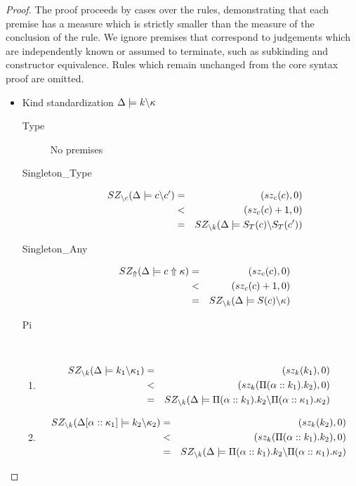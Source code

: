 \documentclass[12pt,twoside,fleqn]{amsart}
\theoremstyle{plain}
\theoremstyle{plain}
\theoremstyle{definition}
\begin{document}
\begin{proof}
The proof proceeds by cases over the rules, demonstrating that each premise
has a measure which is strictly smaller than the measure of the conclusion of
the rule. We ignore premises that correspond to judgements which are independently
known or assumed to terminate, such as subkinding and constructor equivalence.
Rules which remain unchanged from the core syntax proof are omitted.
\begin{itemize}
\item Kind standardization \( \Delta  \models k \backslash \kappa  \)

\begin{description}
\item [Type]No premises
\item [Singleton\_Type]
\begin{eqnarray*}
SZ_{\backslash c}(\Delta   \models c  \backslash c'  ) & = & (sz_{c}(c ),0)\\
 & < & (sz_{c}(c )+1,0)\\
 & = & SZ_{\backslash k}(\Delta   \models S_{T}(c )  \backslash S_{T}(c' )  )
\end{eqnarray*}

\item [Singleton\_Any]
\begin{eqnarray*}
SZ_{\Uparrow }(\Delta   \models c  \Uparrow \kappa   ) & = & (sz_{c}(c ),0)\\
 & < & (sz_{c}(c )+1,0)\\
 & = & SZ_{\backslash k}(\Delta   \models S(c)  \backslash \kappa   )
\end{eqnarray*}

\item [Pi]~
\end{description}
\begin{enumerate}
\item 
\begin{eqnarray*}
SZ_{\backslash k}(\Delta   \models k_{1}  \backslash \kappa _{1}  ) & = & (sz_k(k_{1}),0)\\
 & < & (sz_k(\Pi (\alpha ::k_{1}).k_{2}),0)\\
 & = & SZ_{\backslash k}(\Delta   \models \Pi (\alpha ::k_{1}).k_{2}  \backslash \Pi (\alpha ::\kappa _{1}).\kappa _{2}  )
\end{eqnarray*}

\item 
\begin{eqnarray*}
SZ_{\backslash k}(\Delta  [\alpha   ::\kappa _{1}  ]  \models k_{2}  \backslash \kappa _{2}  ) & = & (sz_k(k_{2}),0)\\
 & < & (sz_k(\Pi (\alpha ::k_{1}).k_{2}),0)\\
 & = & SZ_{\backslash k}(\Delta   \models \Pi (\alpha ::k_{1}).k_{2}  \backslash \Pi (\alpha ::\kappa _{1}).\kappa _{2}  )
\end{eqnarray*}


\end{enumerate}
\end{itemize}
\end{proof}
\end{document}
